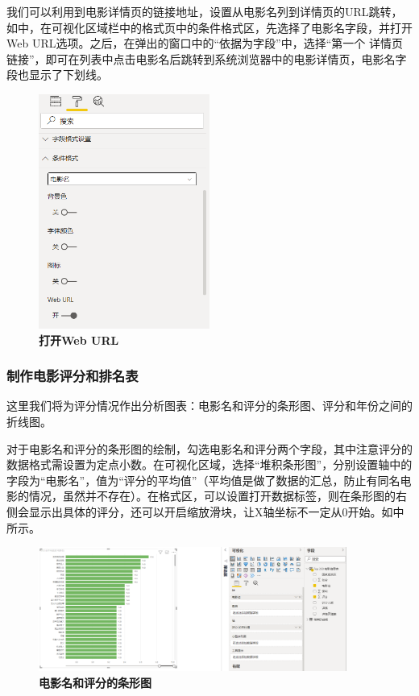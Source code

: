 我们可以利用到电影详情页的链接地址，设置从电影名列到详情页的URL跳转，如中，在可视化区域栏中的格式页中的条件格式区，先选择了电影名字段，并打开Web URL选项。之后，在弹出的窗口中的``依据为字段''中，选择``第一个 详情页链接''，即可在列表中点击电影名后跳转到系统浏览器中的电影详情页，电影名字段也显示了下划线。

\begin{figure}[htbp]
    \centering
    \includegraphics[width=0.5\textwidth]{figure/PowerBI/douban_select_url.png}
    \caption{\textbf{打开Web URL}}
    \label{fig:douban_select_url}
\end{figure}

\subsubsection{制作电影评分和排名表}

这里我们将为评分情况作出分析图表：电影名和评分的条形图、评分和年份之间的折线图。

对于电影名和评分的条形图的绘制，勾选电影名和评分两个字段，其中注意评分的数据格式需设置为定点小数。在可视化区域，选择``堆积条形图''，分别设置轴中的字段为``电影名''，值为``评分的平均值''（平均值是做了数据的汇总，防止有同名电影的情况，虽然并不存在）。在格式区，可以设置打开数据标签，则在条形图的右侧会显示出具体的评分，还可以开启缩放滑块，让X轴坐标不一定从0开始。如中所示。

\begin{figure}[htbp]
    \centering
    \includegraphics[width=0.9\textwidth]{figure/PowerBI/douban_score_movie_name.png}
    \caption{\textbf{电影名和评分的条形图}}
    \label{fig:douban_score_movie_name}
\end{figure}

